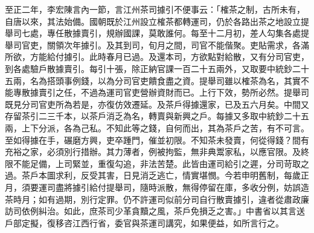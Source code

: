 \begin{pinyinscope}
 至正二年，李宏陳言內一節，言江州茶司據引不便事云：「榷茶之制，古所未有，自唐以來，其法始備。國朝既於江州設立榷茶都轉運司，仍於各路出茶之地設立提舉司七處，專任散據賣引，規辦國課，莫敢誰何。每至十二月初，差人勾集各處提舉司官吏，關領次年據引。及其到司，旬月之間，司官不能偕聚。吏貼需求，各滿所欲，方能給付據引。此時春月已過。及還本司，方欲點對給散，又有分司官吏，到各處驗戶散據賣引。每引十張，除正納官課一百二十五兩外，又取要中統鈔二十五兩，名為搭頭事例錢，以為分司官吏饋食盡之資。提舉司雖以榷茶為名，其實不能專散據賣引之任，不過為運司官吏營辦資財而已。上行下效，勢所必然。提舉司既見分司官吏所為若是，亦復仿效遷延。及茶戶得據還家，已及五六月矣。中間又存留茶引二三千本，以茶戶消乏為名，轉賣與新興之戶。每據又多取中統鈔二十五兩，上下分派，各為己私。不知此等之錢，自何而出，其為茶戶之苦，有不可言。至如得據在手，碾磨方興，吏卒踵門，催並初限。不知茶未發賣，何從得錢？間有充裕之家，必須別行措辦。其力薄者，例被拘監，無非典鬻家私，以應官限。及終限不能足備，上司緊並，重復勾追，非法苦楚。此皆由運司給引之遲，分司苛取之過。茶戶本圖求利，反受其害，日見消乏逃亡，情實堪憫。今若申明舊制，每歲正月，須要運司盡將據引給付提舉司，隨時派散，無得停留在庫，多收分例，妨誤造茶時月；如有過期，別行定罪。仍不許運司似前分司自行散賣據引，違者從肅政廉訪司依例糾治。如此，庶茶司少革貪黷之風，茶戶免損乏之害。」中書省以其言送戶部定擬，復移咨江西行省，委官與茶運司講究，如果便益，如所言行之。



\end{pinyinscope}